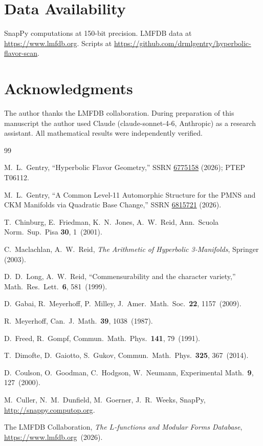 \documentclass[11pt,a4paper]{article}
\theoremstyle{definition}
\theoremstyle{remark}
\begin{document}
\section*{Data Availability}
SnapPy computations at 150-bit precision.
LMFDB data at \url{https://www.lmfdb.org}.
Scripts at \url{https://github.com/drmlgentry/hyperbolic-flavor-scan}.

\section*{Acknowledgments}
The author thanks the LMFDB collaboration.
During preparation of this manuscript the author used Claude
(claude-sonnet-4-6, Anthropic) as a research assistant.
All mathematical results were independently verified.

\begin{thebibliography}{99}

M.~L.~Gentry,
``Hyperbolic Flavor Geometry,''
SSRN \href{https://doi.org/10.2139/ssrn.6775158}{6775158} (2026);
PTEP T06112.

M.~L.~Gentry,
``A Common Level-11 Automorphic Structure for the PMNS and CKM
Manifolds via Quadratic Base Change,''
SSRN \href{https://doi.org/10.2139/ssrn.6815721}{6815721} (2026).

T.~Chinburg, E.~Friedman, K.~N.~Jones, A.~W.~Reid,
Ann.\ Scuola Norm.\ Sup.\ Pisa \textbf{30}, 1~(2001).

C.~Maclachlan, A.~W.~Reid,
\emph{The Arithmetic of Hyperbolic 3-Manifolds}, Springer (2003).

D.~D.~Long, A.~W.~Reid,
``Commensurability and the character variety,''
Math.\ Res.\ Lett.\ \textbf{6}, 581~(1999).

D.~Gabai, R.~Meyerhoff, P.~Milley,
J.\ Amer.\ Math.\ Soc.\ \textbf{22}, 1157~(2009).

R.~Meyerhoff,
Can.\ J.\ Math.\ \textbf{39}, 1038~(1987).

D.~Freed, R.~Gompf,
Commun.\ Math.\ Phys.\ \textbf{141}, 79~(1991).

T.~Dimofte, D.~Gaiotto, S.~Gukov,
Commun.\ Math.\ Phys.\ \textbf{325}, 367~(2014).

D.~Coulson, O.~Goodman, C.~Hodgson, W.~Neumann,
Experimental Math.\ \textbf{9}, 127~(2000).

M.~Culler, N.~M.~Dunfield, M.~Goerner, J.~R.~Weeks,
SnapPy, \url{http://snappy.computop.org}.

The LMFDB Collaboration,
\emph{The $L$-functions and Modular Forms Database},
\url{https://www.lmfdb.org}~(2026).

\end{thebibliography}
\end{document}
